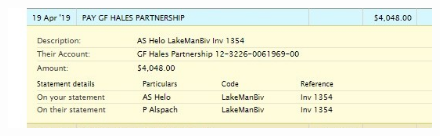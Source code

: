 \documentclass[12pt]{article} %
\begin{document}

\begin{figure}[H]
\begin{center}
   \includegraphics[width=16cm]{BCTClaimLMBHelicopterReceipt}
\end{center}
\end{figure}
\end{document}
